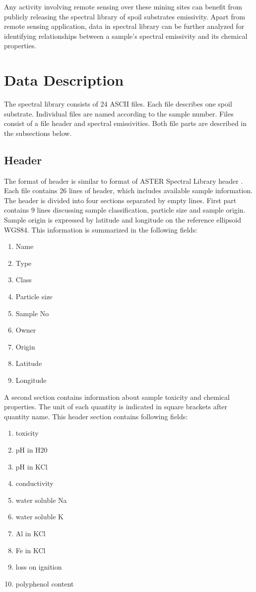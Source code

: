 Any activity involving remote sensing over these mining sites can benefit from publicly releasing the spectral library of spoil substrates emissivity. Apart from remote sensing application, data in spectral library can be further analyzed for identifying relationships between a sample’s spectral emissivity and its chemical properties.

\section{Data Description}

The spectral library consists of 24 ASCII files. Each file describes one spoil substrate. Individual files are named according to the sample number. Files consist of a file header and spectral emissivities. Both file parts are described in the subsections below.

\subsection{Header}

The format of header is similar to format of ASTER Spectral Library header \cite{BH09}. Each file contains 26 lines of header, which includes available sample information. The header is divided into four sections separated by empty lines. First part contains 9 lines discussing sample classification, particle size and sample origin. Sample origin is expressed by latitude and longitude on the reference ellipsoid WGS84. This information is summarized in the following fields:

\begin{enumerate}
	\item	Name
	\item Type
	\item Class
	\item Particle size
	\item Sample No
	\item Owner
	\item Origin
	\item Latitude
	\item Longitude
\end{enumerate}

A second section contains information about sample toxicity and chemical properties. The unit of each quantity is indicated in square brackets after quantity name. This header section contains following fields:

\begin{enumerate}
	\item toxicity
	\item pH in H20
	\item pH in KCl
	\item conductivity
	\item water soluble Na
	\item water soluble K
	\item Al in KCl
	\item Fe in KCl
	\item loss on ignition
	\item polyphenol content
\end{enumerate}

